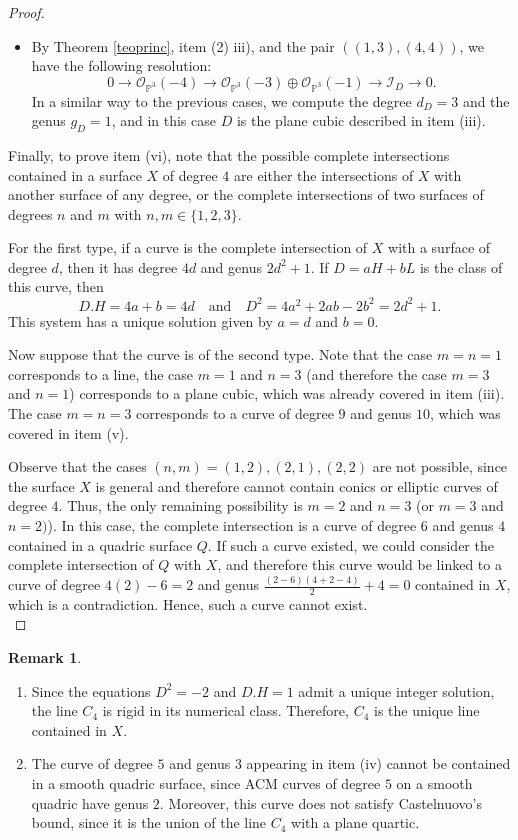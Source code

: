 \documentclass[12pt,reqno]{amsart}
\theoremstyle{plain}
\theoremstyle{definition}
\newtheorem{rmk}[theorem]{Remark}
\theoremstyle{remark}
\theoremstyle{definition}
\newcommand{\PP}{\mathds{P}}
\newcommand{\PPP}{\PP^{3}}
\newcommand{\ii}{\mathscr{I}}
\newcommand{\oo}{\mathcal{O}}
\begin{document}
\begin{proof}
\begin{itemize}
    \item[Case 8:] By Theorem \ref{teoprinc}, item (2) iii), and the pair $((1,3),(4,4))$, we have the following resolution:
    $$0\to \oo_{\PPP}(-4) \to \oo_{\PPP}(-3)\oplus \oo_{\PPP}(-1) \to \ii_{D}\to 0.$$
    In a similar way to the previous cases, we compute the degree $d_{D}=3$ and the genus $g_{D}=1$, and in this case $D$ is the plane cubic described in item (iii).
\end{itemize}

Finally, to prove item (vi), note that the possible complete intersections contained in a surface $X$ of degree $4$ are either the intersections of $X$ with another surface of any degree, or the complete intersections of two surfaces of degrees $n$ and $m$ with $n,m\in\{1,2,3\}$. 

For the first type, if a curve is the complete intersection of $X$ with a surface of degree $d$, then it has degree $4d$ and genus $2d^{2}+1$. If $D=aH+bL$ is the class of this curve, then
$$
D.H=4a+b=4d \quad \text{and} \quad D^{2}=4a^{2}+2ab-2b^{2}=2d^{2}+1.
$$
This system has a unique solution given by $a=d$ and $b=0$.

Now suppose that the curve is of the second type. Note that the case $m=n=1$ corresponds to a line, the case $m=1$ and $n=3$ (and therefore the case $m=3$ and $n=1$) corresponds to a plane cubic, which was already covered in item (iii). The case $m=n=3$ corresponds to a curve of degree $9$ and genus $10$, which was covered in item (v). 

Observe that the cases $(n,m)=(1,2),(2,1),(2,2)$ are not possible, since the surface $X$ is general and therefore cannot contain conics or elliptic curves of degree $4$. Thus, the only remaining possibility is $m=2$ and $n=3$ (or $m=3$ and $n=2)$). In this case, the complete intersection is a curve of degree $6$ and genus $4$ contained in a quadric surface $Q$. If such a curve existed, we could consider the complete intersection of $Q$ with $X$, and therefore this curve would be linked to a curve of degree $4(2)-6=2$ and genus $\frac{(2-6)(4+2-4)}{2}+4=0$ contained in $X$, which is a contradiction. Hence, such a curve cannot exist.\\

\end{proof}



\begin{rmk}
\begin{enumerate}
    \item Since the equations $D^{2}=-2$ and $D.H=1$ admit a unique integer solution,
    the line $C_4$ is rigid in its numerical class. Therefore, $C_4$ is the unique line
    contained in $X$.

    \item The curve of degree $5$ and genus $3$ appearing in item (iv) cannot be
    contained in a smooth quadric surface, since ACM curves of degree $5$ on a smooth
    quadric have genus $2$. Moreover, this curve does not satisfy Castelnuovo's bound,
    since it is the union of the line $C_4$ with a plane quartic.
\end{enumerate}
\end{rmk}
\end{document}
